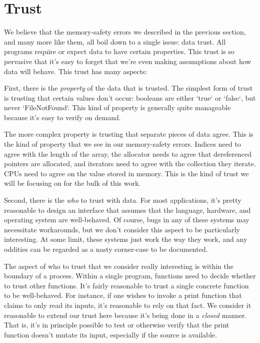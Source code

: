 \chapter{Trust}
\label{ch:trust}

We believe that the memory-safety errors we described in the previous
section, and many more like them, all boil down to a single issue: data trust.
All programs require or expect data to have certain properties. This trust
is so pervasive that it's easy to forget that we're even making assumptions about
how data will behave. This trust has many aspects:




First, there is the \emph{property} of the data that is trusted. The simplest form of
trust is trusting that certain values don't occur: booleans are either `true`
or `false`, but never `FileNotFound`. This kind of property is generally quite
manageable because it's easy to verify on demand.

The more complex property is trusting that separate pieces of data agree.
This is the kind of property that we see in our memory-safety errors. Indices need
to agree with the length of the array, the allocator needs to agree that
dereferenced pointers are allocated, and iterators need to agree with the collection
they iterate. CPUs need to agree on the value stored in memory. This is the kind of
trust we will be focusing on for the bulk of this work.




Second, there is the \emph{who} to trust with data. For most applications, it's pretty
reasonable to design an interface that assumes that the language, hardware, and
operating system are well-behaved. Of course, bugs in any of these systems
may necessitate workarounds, but we don't consider this aspect to be particularly
interesting. At some limit, these systems just work the way they work, and any
oddities can be regarded as a nasty corner-case to be documented.

The aspect of who to trust that we consider really interesting is within the
boundary of a process. Within a single program, functions need to decide whether
to trust other functions. It's fairly reasonable to trust a single concrete
function to be well-behaved. For instance, if one wishes to invoke a print
function that claims to only read its inputs, it's reasonable to rely on that
fact. We consider it reasonable to extend our trust here because it's being done
in a \emph{closed} manner. That is, it's in principle possible to test or otherwise
verify that the print function doesn't mutate its input, especially if the
source is available.

